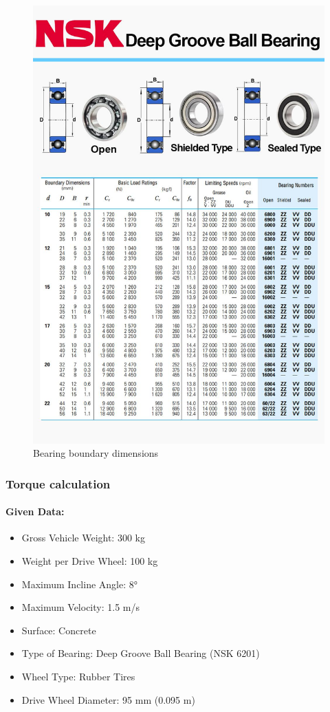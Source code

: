 \documentclass[../../main]{subfiles}
\begin{document}
\newpage
\begin{figure}[H]
\centering
\includegraphics[width=\textwidth]{img/img1.jpg}
\caption{Bearing boundary dimensions}
\end{figure}
\newpage

\subsubsection{Torque calculation}

\paragraph{Given Data:}
\begin{itemize}
\item
  Gross Vehicle Weight: 300 kg
\item
  Weight per Drive Wheel: 100 kg
\item
  Maximum Incline Angle: 8°
\item
  Maximum Velocity: 1.5 m/s
\item
  Surface: Concrete
\item
  Type of Bearing: Deep Groove Ball Bearing (NSK 6201)
\item
  Wheel Type: Rubber Tires
\item
  Drive Wheel Diameter: 95 mm (0.095 m)
\end{itemize}
\end{document}
